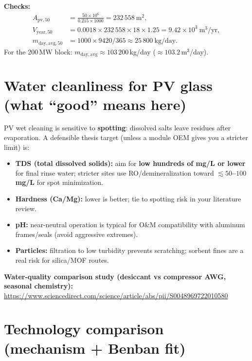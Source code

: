 \documentclass[11pt,a4paper]{article}
\begin{document}
\noindent\textbf{Checks:}
\begin{align*}
A_{\mathrm{pv},50}  &= \frac{50\times 10^6}{0.215\times 1000}=232\,558\ \mathrm{m^2},\\
V_{\mathrm{year},50}&=0.0018\times 232\,558\times 18\times 1.25 = 9.42\times 10^3\ \mathrm{m^3/yr},\\
m_{\mathrm{day,avg},50}&=1000\times 9420/365 \approx 25\,800\ \mathrm{kg/day}.
\end{align*}
For the 200\,MW block: $m_{\mathrm{day,avg}}\approx 103\,200$\,kg/day ($\approx 103.2$\,m$^3$/day).

\section{Water cleanliness for PV glass (what ``good'' means here)}
PV wet cleaning is sensitive to \textbf{spotting}: dissolved salts leave residues after evaporation. A defensible thesis target (unless a module OEM gives you a stricter limit) is:
\begin{itemize}[nosep]
  \item \textbf{TDS (total dissolved solids):} aim for \textbf{low hundreds of mg/L or lower} for final rinse water; stricter sites use RO/demineralization toward \textbf{$\lesssim 50$--$100$\,mg/L} for spot minimization.
  \item \textbf{Hardness (Ca/Mg):} lower is better; tie to spotting risk in your literature review.
  \item \textbf{pH:} near-neutral operation is typical for O\&M compatibility with aluminum frames/seals (avoid aggressive extremes).
  \item \textbf{Particles:} filtration to low turbidity prevents scratching; sorbent fines are a real risk for silica/MOF routes.
\end{itemize}
\textbf{Water-quality comparison study (desiccant vs compressor AWG, seasonal chemistry):}\\
\url{https://www.sciencedirect.com/science/article/abs/pii/S0048969722010580}

\section{Technology comparison (mechanism + Benban fit)}
\end{document}
